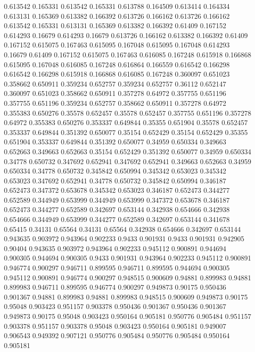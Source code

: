 0.613542 0.165331
0.613542 0.165331
0.613788 0.164509
0.613414 0.164334
0.613131 0.165369
0.613382 0.166392
0.613726 0.166162
0.613726 0.166162
0.613542 0.165331
0.613131 0.165369
0.613382 0.166392
0.61409 0.167152
0.614293 0.16679
0.614293 0.16679
0.613726 0.166162
0.613382 0.166392
0.61409 0.167152
0.615075 0.167463
0.615095 0.167048
0.615095 0.167048
0.614293 0.16679
0.61409 0.167152
0.615075 0.167463
0.616085 0.167248
0.615918 0.166868
0.615095 0.167048
0.616085 0.167248
0.616864 0.166559
0.616542 0.166298
0.616542 0.166298
0.615918 0.166868
0.616085 0.167248
0.360097 0.651023
0.358662 0.650911
0.359234 0.652757
0.359234 0.652757
0.36112 0.652147
0.360097 0.651023
0.358662 0.650911
0.357278 0.64972
0.357755 0.651196
0.357755 0.651196
0.359234 0.652757
0.358662 0.650911
0.357278 0.64972
0.355383 0.650276
0.35578 0.652457
0.35578 0.652457
0.357755 0.651196
0.357278 0.64972
0.355383 0.650276
0.353337 0.649844
0.35355 0.651904
0.35578 0.652457
0.353337 0.649844
0.351392 0.650077
0.35154 0.652429
0.35154 0.652429
0.35355 0.651904
0.353337 0.649844
0.351392 0.650077
0.34959 0.650334
0.349663 0.652663
0.349663 0.652663
0.35154 0.652429
0.351392 0.650077
0.34959 0.650334
0.34778 0.650732
0.347692 0.652941
0.347692 0.652941
0.349663 0.652663
0.34959 0.650334
0.34778 0.650732
0.345842 0.650994
0.345342 0.653023
0.345342 0.653023
0.347692 0.652941
0.34778 0.650732
0.345842 0.650994
0.346187 0.652473
0.347372 0.653678
0.345342 0.653023
0.346187 0.652473
0.344277 0.652589
0.344949 0.653999
0.344949 0.653999
0.347372 0.653678
0.346187 0.652473
0.344277 0.652589
0.342697 0.653144
0.342938 0.654666
0.342938 0.654666
0.344949 0.653999
0.344277 0.652589
0.342697 0.653144
0.341678 0.65415
0.34131 0.65564
0.34131 0.65564
0.342938 0.654666
0.342697 0.653144
0.943635 0.903972
0.943964 0.902233
0.9433 0.901931
0.9433 0.901931
0.942905 0.90404
0.943635 0.903972
0.943964 0.902233
0.945112 0.900891
0.944694 0.900305
0.944694 0.900305
0.9433 0.901931
0.943964 0.902233
0.945112 0.900891
0.946774 0.900297
0.946711 0.899595
0.946711 0.899595
0.944694 0.900305
0.945112 0.900891
0.946774 0.900297
0.948515 0.900609
0.94881 0.899983
0.94881 0.899983
0.946711 0.899595
0.946774 0.900297
0.949873 0.90175
0.950436 0.901367
0.94881 0.899983
0.94881 0.899983
0.948515 0.900609
0.949873 0.90175
0.95048 0.903423
0.951157 0.903378
0.950436 0.901367
0.950436 0.901367
0.949873 0.90175
0.95048 0.903423
0.950164 0.905181
0.950776 0.905484
0.951157 0.903378
0.951157 0.903378
0.95048 0.903423
0.950164 0.905181
0.949007 0.906543
0.949392 0.907121
0.950776 0.905484
0.950776 0.905484
0.950164 0.905181
